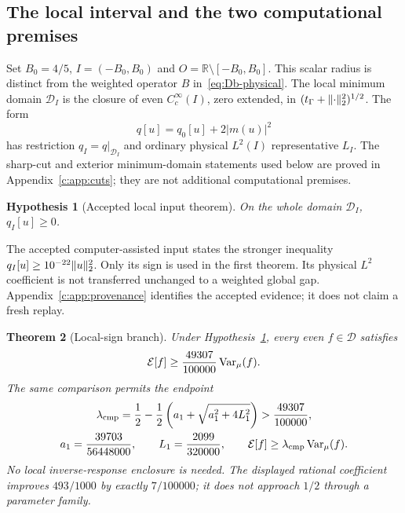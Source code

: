 \documentclass[11pt,a4paper]{article}
\numberwithin{equation}{section}
\newtheorem{theorem}{Theorem}[section]
\newtheorem{hypothesis}[theorem]{Hypothesis}
\theoremstyle{definition}\newtheorem{definition}[theorem]{Definition}
\theoremstyle{remark}\newtheorem{remark}[theorem]{Remark}
\newcommand{\R}{\mathbb R}\newcommand{\C}{\mathbb C}\newcommand{\N}{\mathbb N}
\newcommand{\E}{\mathcal E}\newcommand{\D}{\mathcal D}
\newcommand{\tg}{t_\Gamma}\newcommand{\cg}{c_\Gamma}
\begin{document}
\subsection{The local interval and the two computational premises}\label{c:sec:premises}
Set $B_0=4/5$, $I=(-B_0,B_0)$ and $O=\R\setminus[-B_0,B_0]$. This scalar radius is distinct from the weighted operator $B$ in~\eqref{eq:Db-physical}. The local minimum domain $\D_I$ is the closure of even $C_c^\infty(I)$, zero extended, in $(\tg+\norm{\cdot}_2^2)^{1/2}$. The form
\[
 q[u]=q_0[u]+2|m(u)|^2
\]
has restriction $q_I=q|_{\D_I}$ and ordinary physical $L^2(I)$ representative $L_I$. The sharp-cut and exterior minimum-domain statements used below are proved in Appendix~\ref{c:app:cuts}; they are not additional computational premises.


\begin{hypothesis}[Accepted local input theorem]\label{c:hyp:local}
On the whole domain $\D_I$, $q_I[u]\ge0$.
\end{hypothesis}
The accepted computer-assisted input states the stronger inequality $q_I[u]\ge10^{-22}\lVert u\rVert_2^2$. Only its sign is used in the first theorem. Its physical $L^2$ coefficient is not transferred unchanged to a weighted global gap. Appendix~\ref{c:app:provenance} identifies the accepted evidence; it does not claim a fresh replay.

\begin{theorem}[Local-sign branch]\label{c:thm:localglobal}
Under Hypothesis~\ref{c:hyp:local}, every even $f\in\D$ satisfies
\begin{equation}\label{c:eq:49307}
 \E[f]\ge\frac{49307}{100000}\Var_\mu(f).
\end{equation}
The same comparison permits the endpoint
\begin{equation}\label{c:eq:lambdaendpoint}
 \begin{gathered}
 \lambda_{\rm cmp}=\frac12-\frac12\left(a_1+\sqrt{a_1^2+4L_1^2}\right)
 >\frac{49307}{100000},\\
 a_1=\frac{39703}{56448000},\qquad L_1=\frac{2099}{320000},\qquad
 \E[f]\ge\lambda_{\rm cmp}\Var_\mu(f).
 \end{gathered}
\end{equation}
No local inverse-response enclosure is needed. The displayed rational coefficient improves $493/1000$ by exactly $7/100000$; it does not approach $1/2$ through a parameter family.
\end{theorem}
\end{document}
